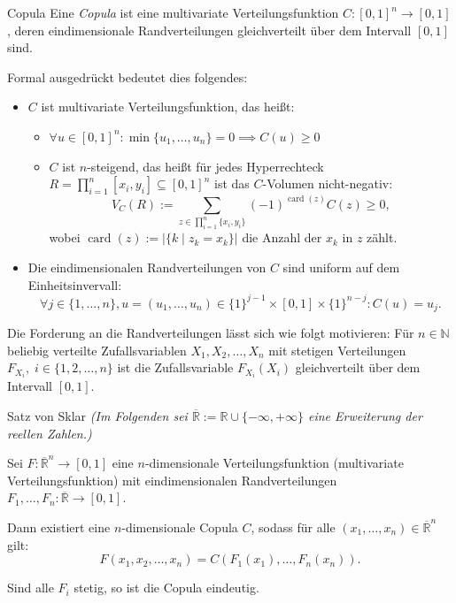 \begin{bonus}{Copula}
    Eine \emph{Copula} ist eine multivariate Verteilungsfunktion $C : [0,1]^{n}\rightarrow [0,1]$, deren eindimensionale Randverteilungen gleichverteilt über dem Intervall $[0,1]$ sind.

    Formal ausgedrückt bedeutet dies folgendes:
    \begin{itemize}
        \item $C$ ist multivariate Verteilungsfunktion, das heißt:
              \begin{itemize}
                  \item $\forall u \in [0,1]^{n} : \min\{u_1, \dotsc, u_n\} = 0 \implies C(u) \geq 0$
                  \item $C$ ist $n$-steigend, das heißt für jedes Hyperrechteck $R = \prod_{i=1}^{n} [x_i, y_i] \subseteq [0,1]^{n}$ ist das $C$-Volumen nicht-negativ:
                        \[
                            V_C(R) := \sum_{z \in \prod_{i=1}^n \{x_i, y_i\}} (-1)^{\operatorname{card}(z)} C(z) \geq 0,
                        \]
                        wobei $\operatorname{card}(z) := |\{k \mid z_k = x_k \}|$ die Anzahl der $x_k$ in $z$ zählt.
              \end{itemize}
        \item Die eindimensionalen Randverteilungen von $C$ sind uniform auf dem Einheitsinvervall:
              \[
                  \forall j \in \{1, \dotsc, n \}, u = (u_1, \dotsc, u_n) \in \{1\}^{j-1} \times [0, 1] \times \{1\}^{n-j} : C(u) = u_j.
              \]
    \end{itemize}

    Die Forderung an die Randverteilungen lässt sich wie folgt motivieren:
    Für $n\in \mathbb {N}$ beliebig verteilte Zufallsvariablen $X_{1},X_{2},\dotsc ,X_{n}$ mit stetigen Verteilungen $F_{X_{i}},\;i\in \{1,2,\dotsc ,n\}$ ist die Zufallsvariable $F_{X_{i}}(X_{i})$ gleichverteilt über dem Intervall $[0,1]$.
\end{bonus}

\begin{theo}{Satz von Sklar}
    \textit{(Im Folgenden sei $\overline {\mathbb {R}} :=\mathbb {R} \cup \{-\infty ,+\infty \}$ eine Erweiterung der reellen Zahlen.)}

    Sei $F:{\overline {\mathbb {R}}}^{n}\rightarrow [0,1]$ eine $n$-dimensionale Verteilungsfunktion (multivariate Verteilungsfunktion) mit eindimensionalen Randverteilungen $F_{1},\ldots ,F_{n}:{\overline {\mathbb {R}}}\rightarrow [0,1]$.

    Dann existiert eine $n$-dimensionale Copula $C$, sodass für alle $(x_{1},\ldots ,x_{n})\in {\overline {\mathbb {R}}}^{n}$ gilt:
    \[
        F(x_{1},x_{2},\ldots ,x_{n})=C\left(F_{1}\left(x_{1}\right),\ldots ,F_{n}\left(x_{n}\right)\right).
    \]

    Sind alle $F_{i}$ stetig, so ist die Copula eindeutig.
\end{theo}

